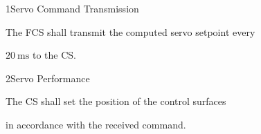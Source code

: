 \req
	{1}{Servo Command Transmission}
	{

        The FCS shall transmit the computed servo setpoint every

        $\SI{20}{\milli\second}$ to the CS.

    }
	{}

\req
	{2}{Servo Performance}
	{

        The CS shall set the position of the control surfaces

        in accordance with the received command.

    }
	{}

